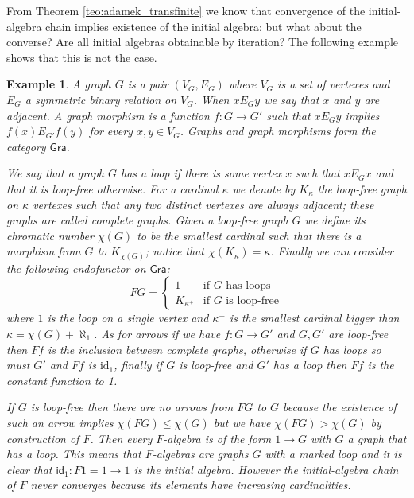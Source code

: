 \documentclass[letterpaper, 11pt, oneside]{memoir}
\theoremstyle{myteo}
\newtheorem{example}[theorem]{Example}
\numberwithin{equation}{section}
\newcommand{\id}{\textsf{id}}
\begin{document}
From Theorem \ref{teo:adamek_transfinite} we know that convergence of the initial-algebra chain implies existence of the initial algebra; but what about the converse?
Are all initial algebras obtainable by iteration?
The following example shows that this is not the case.
\begin{example}
  A graph \(G\) is a pair \((V_G, E_G)\) where \(V_G\) is a set of vertexes and \(E_G\) a symmetric binary relation on \(V_G\).
  When \(x E_G y\) we say that \(x\) and \(y\) are adjacent.
  A graph morphism is a function \(f : G \to G'\) such that \(x E_G y\) implies \(f(x) E_{G'} f(y)\) for every \(x, y \in V_G\).
  Graphs and graph morphisms form the category \(\textsf{Gra}\).

  We say that a graph \(G\) has a loop if there is some vertex \(x\) such that \(x E_G x\) and that it is loop-free otherwise.
  For a cardinal \(\kappa\) we denote by \(K_\kappa\) the loop-free graph on \(\kappa\) vertexes such that any two distinct vertexes are always adjacent; these graphs are called complete graphs.
  Given a loop-free graph \(G\) we define its chromatic number \(\chi(G)\) to be the smallest cardinal such that there is a morphism from \(G\) to \(K_{\chi(G)}\); notice that \(\chi(K_\kappa) = \kappa\).
  Finally we can consider the following endofunctor on \(\textsf{Gra}\):
  \begin{equation*}
    FG = \begin{cases}
      1 & \text{if \(G\) has loops}\\
      K_{\kappa^+} & \text{if \(G\) is loop-free}
    \end{cases}
  \end{equation*}
  where \(1\) is the loop on a single vertex and \(\kappa^+\) is the smallest cardinal bigger than \(\kappa = \chi(G) + \aleph_1\).
  As for arrows if we have \(f: G \to G'\) and \(G, G'\) are loop-free then \(Ff\) is the inclusion between complete graphs, otherwise if \(G\) has loops so must \(G'\) and \(Ff\) is \(\text{id}_1\), finally if \(G\) is loop-free and \(G'\) has a loop then \(Ff\) is the constant function to 1.

  If \(G\) is loop-free then there are no arrows from \(FG\) to \(G\) because the existence of such an arrow implies \(\chi(FG) \leq \chi(G)\) but we have \(\chi(FG) > \chi(G)\) by construction of \(F\).
  Then every \(F\)-algebra is of the form \(1 \to G\) with \(G\) a graph that has a loop.
  This means that \(F\)-algebras are graphs \(G\) with a marked loop and it is clear that \(\id_1 : F1 = 1 \to 1\) is the initial algebra.
  However the initial-algebra chain of \(F\) never converges because its elements have increasing cardinalities.
\end{example}
\end{document}
